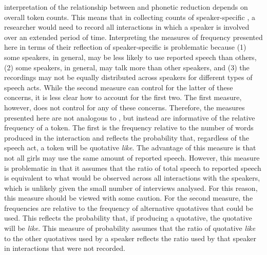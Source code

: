  interpretation of the relationship between  and phonetic reduction depends on overall token counts. This means that in collecting counts of speaker-specific , a researcher would need to record all interactions in which a speaker is involved over an extended period of time. Interpreting the measures of frequency presented here in terms of their reflection of speaker-specific  is problematic because (1) some speakers, in general, may be less likely to use reported speech than others, (2) some speakers, in general, may talk more than other speakers, and (3) the recordings may not be equally distributed across speakers for different types of speech acts. While the second measure can control for the latter of these concerns, it is less clear how to account for the first two. The first measure, however, does not control for any of these concerns. Therefore, the measures presented here are not analogous to , but instead are informative of the relative frequency of a token. The first is the frequency relative to the number of words produced in the interaction and reflects the probability that, regardless of the speech act, a token will be quotative \textit{like}. The advantage of this measure is that not all girls may use the same amount of reported speech. However, this measure is problematic in that it assumes that the ratio of total speech to reported speech is equivalent to what would be observed across all interactions with the speakers, which is unlikely given the small number of interviews analysed. For this reason, this measure should be viewed with some caution. For the second measure, the frequencies are relative to the frequency of alternative quotatives that could be used. This reflects the probability that, if producing a quotative, the quotative will be \textit{like}. This measure of probability assumes that the ratio of quotative \textit{like} to the other quotatives used by a speaker reflects the ratio used by that speaker in interactions that were not recorded.

\nocite{bybee2002}



